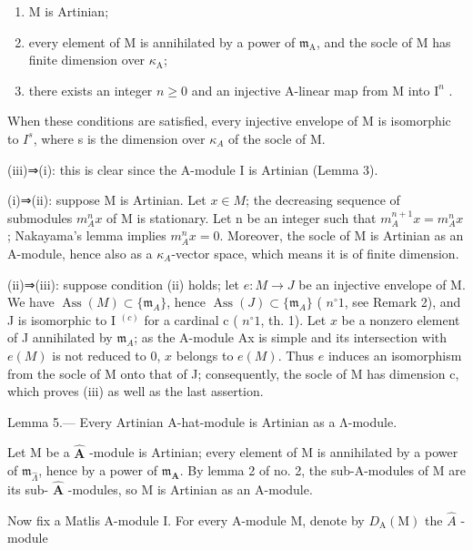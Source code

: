 \begin{enumerate}
\def\labelenumi{(\roman{enumi})}
\item
  M is Artinian;
\item
  every element of M is annihilated by a power of \(\mathfrak{m}_{\mathrm{A}}\), and the socle of M has finite dimension over \(\kappa_{\mathrm{A}}\);
\item
  there exists an integer \(n \geqslant 0\) and an injective A-linear map from M into \(\mathrm{I}^n\) .
\end{enumerate}

When these conditions are satisfied, every injective envelope of M is isomorphic to \(I^{s}\), where s is the dimension over \(\kappa_{A}\) of the socle of M.

(iii)⇒(i): this is clear since the A-module I is Artinian (Lemma 3).

(i)⇒(ii): suppose M is Artinian. Let \(x \in M\); the decreasing sequence of submodules \(m_{A}^{n}x\) of M is stationary. Let n be an integer such that \(m_{A}^{n+1}x = m_{A}^{n}x\); Nakayama's lemma implies \(m_{A}^{n}x = 0\). Moreover, the socle of M is Artinian as an A-module, hence also as a \(\kappa_{A}\)-vector space, which means it is of finite dimension.

(ii)⇒(iii): suppose condition (ii) holds; let \(e:M\to J\) be an injective envelope of M. We have \(\operatorname{Ass}(M)\subset\{\mathfrak{m}_{A}\}\), hence \(\operatorname{Ass}(J)\subset\{\mathfrak{m}_{A}\}\) ( \(n^{\circ} 1\), see Remark 2), and J is isomorphic to I \(^{(c)}\) for a cardinal c ( \(n^{\circ} 1\), th. 1). Let \(x\) be a nonzero element of J annihilated by \(\mathfrak{m}_{A}\); as the A-module Ax is simple and its intersection with \(e(M)\) is not reduced to 0, \(x\) belongs to \(e(M)\). Thus \(e\) induces an isomorphism from the socle of M onto that of J; consequently, the socle of M has dimension c, which proves (iii) as well as the last assertion.

Lemma 5.--- Every Artinian A-hat-module is Artinian as a Λ-module.

Let M be a \(\widehat{\mathbf{A}}\) -module is Artinian; every element of M is annihilated by a power of \(\mathfrak{m}_{\widehat{\Lambda}}\), hence by a power of \(\mathfrak{m}_{\mathbf{A}}\). By lemma 2 of no. 2, the sub-A-modules of M are its sub- \(\widehat{\mathbf{A}}\) -modules, so M is Artinian as an A-module.

Now fix a Matlis A-module I. For every A-module M, denote by \(D_{\mathrm{A}}(\mathrm{M})\) the \(\widehat{A}\) -module

